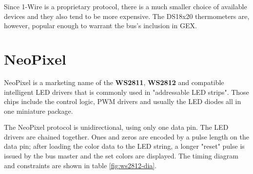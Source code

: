Since 1-Wire is a proprietary protocol, there is a much smaller choice of available devices and they also tend to be more expensive. The DS18x20 thermometers are, however, popular enough to warrant the bus's inclusion in GEX.

\section{NeoPixel} \label{sec:theory-neo}

NeoPixel is a marketing name of the \textbf{WS2811}, \textbf{WS2812} and compatible intelligent \gls{LED} drivers that is commonly used in "addressable \gls{LED} strips". Those chips include the control logic, PWM drivers and usually the \gls{LED} diodes all in one miniature package.

The NeoPixel protocol is unidirectional, using only one data pin. The \gls{LED} drivers are chained together. Ones and zeros are encoded by a pulse length on the data pin; after loading the color data to the \gls{LED} string, a longer "reset" pulse is issued by the bus master and the set colors are displayed. The timing diagram and constraints are shown in table \ref{fig:ws2812-dia}.

